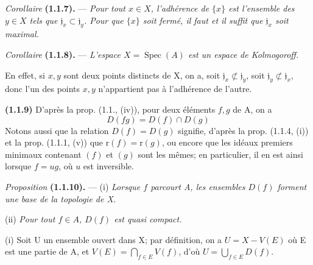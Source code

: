 \textit{Corollaire} \textbf{(1.1.7).} --- \textit{Pour tout $x\in X$, l'adhérence de $\{x\}$ est l'ensemble des $y\in X$ tels que $\mathfrak j_x\subset\mathfrak j_y$. Pour que $\{x\}$ soit fermé, il faut et il suffit que $\mathfrak j_x$ soit maximal.}

\textit{Corollaire} \textbf{(1.1.8).} --- \textit{L'espace $X=\operatorname{Spec}(A)$ est un espace de Kolmogoroff.}

En effet, si $x,y$ sont deux points distincts de X, on a, soit $\mathfrak j_x\not\subset\mathfrak j_y$, soit $\mathfrak j_y\not\subset\mathfrak j_x$, donc l'un des points $x,y$ n'appartient pas à l'adhérence de l'autre.

\textbf{(1.1.9)} D'après la prop. (1.1., (iv)), pour deux éléments $f,g$ de A, on a
\[
D(fg)=D(f)\cap D(g)\tag{1.1.9.1}
\]
Notons aussi que la relation $D(f)=D(g)$ signifie, d'après la prop. (1.1.4, (i)) et la prop. (1.1.1, (v)) que $\mathrm r(f)=\mathrm r(g)$, ou encore que les idéaux premiers minimaux contenant $(f)$ et $(g)$ sont les mêmes; en particulier, il en est ainsi lorsque $f=ug$, où $u$ est inversible.

\textit{Proposition} \textbf{(1.1.10).} --- (i) \textit{Lorsque $f$ parcourt A, les ensembles $D(f)$ forment une base de la topologie de X.}

(ii) \textit{Pour tout $f\in A$, $D(f)$ est quasi compact.} 

(i) Soit U un ensemble ouvert dans X; par définition, on a $U=X-V(E)$ où E est une partie de A, et $V(E)=\bigcap_{f\in E}V(f)$, d'où $U=\bigcup_{f\in E}D(f)$.

